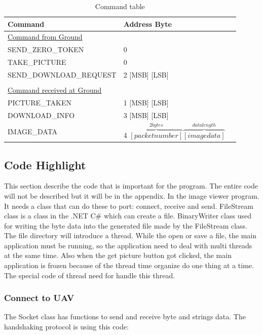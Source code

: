 \documentclass[oneside]{ecsgdp}         %
\begin{document}
\begin{table}[!htbp]

\begin{center}
\begin{tabular}{l l @{.} l}
 Command&
\multicolumn{2}{l}{Address Byte } \\

\hline
\underline{Command from Ground} & \\
SEND\_ZERO\_TOKEN & 0 \\
TAKE\_PICTURE & 0 \\
SEND\_DOWNLOAD\_REQUEST & 2 [MSB] [LSB]  \\
\\
\underline{Command received at Ground}\\
PICTURE\_TAKEN & 1 [MSB] [LSB]\\
DOWNLOAD\_INFO & 3 [MSB] [LSB]\\
IMAGE\_DATA & 4 $\overbrace{ [packet number]}^{2bytes} \overbrace{[image data]}^{data length}$ \\
\end{tabular}
\caption{Command table\label{command_table}}
\end{center}
\end{table}
 
 
\subsection{Code Highlight}

This section describe the code that is important for the program. The entire code will not be described but it will be in the appendix. In the image viewer program. It needs a class that can do these to port: connect, receive and send. FileStream class is a class in the .NET C\# which can create a file. BinaryWriter class used for writing the byte data into the generated file made by the FileStream class. The file directory will introduce a thread. While the open or save a file, the main application must be running, so the application need to deal with multi threads at the same time. Also when the get picture button got clicked, the main application is frozen because of the thread time organize do one thing at a time. The special code of thread need for handle this thread. 

\subsubsection*{Connect to UAV}
The Socket class has functions to send and receive byte and strings data. The handshaking protocol is using this code:
\end{document}
